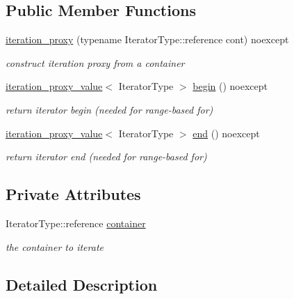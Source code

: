 \subsection*{Public Member Functions}
\begin{DoxyCompactItemize}
\item 
\hyperlink{classnlohmann_1_1detail_1_1iteration__proxy_afe257e972e3b4658ef2e355f7389d4a5}{iteration\+\_\+proxy} (typename Iterator\+Type\+::reference cont) noexcept
\begin{DoxyCompactList}\small\item\em construct iteration proxy from a container \end{DoxyCompactList}\item 
\hyperlink{classnlohmann_1_1detail_1_1iteration__proxy__value}{iteration\+\_\+proxy\+\_\+value}$<$ Iterator\+Type $>$ \hyperlink{classnlohmann_1_1detail_1_1iteration__proxy_a379f86709d340c4ab1995539b8af623d}{begin} () noexcept
\begin{DoxyCompactList}\small\item\em return iterator begin (needed for range-\/based for) \end{DoxyCompactList}\item 
\hyperlink{classnlohmann_1_1detail_1_1iteration__proxy__value}{iteration\+\_\+proxy\+\_\+value}$<$ Iterator\+Type $>$ \hyperlink{classnlohmann_1_1detail_1_1iteration__proxy_a90091f8492d23576edef72c5e8b9d4cf}{end} () noexcept
\begin{DoxyCompactList}\small\item\em return iterator end (needed for range-\/based for) \end{DoxyCompactList}\end{DoxyCompactItemize}
\subsection*{Private Attributes}
\begin{DoxyCompactItemize}
\item 
Iterator\+Type\+::reference \hyperlink{classnlohmann_1_1detail_1_1iteration__proxy_a88c0532ba4a5de1d527b18053b24fd19}{container}
\begin{DoxyCompactList}\small\item\em the container to iterate \end{DoxyCompactList}\end{DoxyCompactItemize}


\subsection{Detailed Description}
